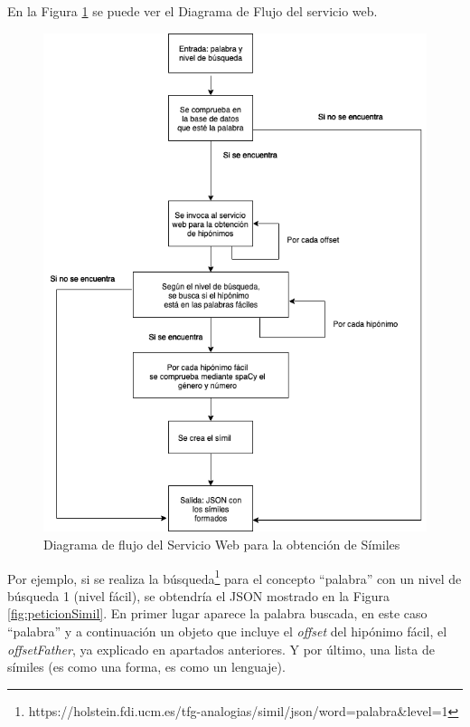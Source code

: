 En la Figura \ref{fig:swsimil} se puede ver el Diagrama de Flujo del servicio web.
\begin{figure}[!h]
	\includegraphics[width=.9\textwidth]{Imagenes/Bitmap/Capitulo4/ServiciosWeb/DiagramaFlujoSimil.png}
	\centering
	\caption{Diagrama de flujo del Servicio Web para la obtención de Símiles}
	\label{fig:swsimil}
\end{figure}



Por ejemplo, si se realiza la búsqueda\footnote{https://holstein.fdi.ucm.es/tfg-analogias/simil/json/word=palabra\&level=1} para el concepto ``palabra'' con un nivel de búsqueda 1 (nivel fácil), se obtendría el JSON mostrado en la Figura \ref{fig:peticionSimil}. En primer lugar aparece la palabra buscada, en este caso ``palabra'' y a continuación un objeto que incluye el \textit{offset} del hipónimo fácil, el \textit{offsetFather}, ya explicado en apartados anteriores. Y por último, una lista de símiles (es como una forma, es como un lenguaje).



